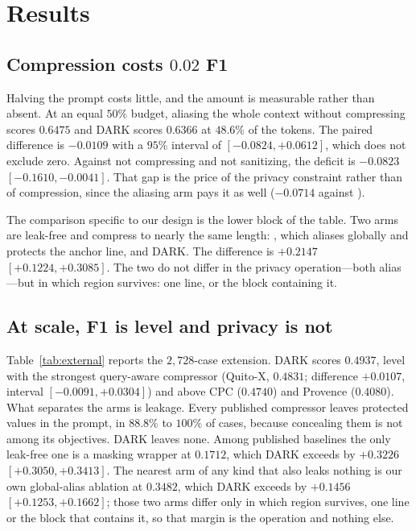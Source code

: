 \section{Results}
\label{sec:results}



\subsection{Compression costs $0.02$ F1}

Halving the prompt costs little, and the amount is measurable rather than absent. At an equal $50\%$
budget, aliasing the whole context without compressing scores $0.6475$ and \textsc{DARK} scores
$0.6366$ at
$48.6\%$ of the tokens. The paired difference is $-0.0109$ with a $95\%$ interval of
$[-0.0824,+0.0612]$, which does not exclude zero. Against not compressing and not sanitizing,
the deficit is $-0.0823$ $[-0.1610,-0.0041]$. That gap is the price of the privacy
constraint rather than of compression, since the aliasing arm pays it as well ($-0.0714$
against ).

The comparison specific to our design is the lower block of the table. Two arms are
leak-free and compress to nearly the same length: , which aliases
globally and protects the anchor line, and \textsc{DARK}. The difference is $+0.2147$
$[+0.1224,+0.3085]$. The two do not differ in the privacy operation---both alias---but in
which region survives: one line, or the block containing it.



\subsection{At scale, F1 is level and privacy is not}

Table~\ref{tab:external} reports the $2{,}728$-case extension. \textsc{DARK} scores
$0.4937$, level with the strongest query-aware compressor (Quito-X, $0.4831$; difference
$+0.0107$, interval $[-0.0091,+0.0304]$) and above CPC ($0.4740$) and Provence ($0.4080$).
What separates the arms is leakage. Every published compressor leaves protected values in
the prompt, in $88.8\%$ to $100\%$ of cases, because concealing them is not among its
objectives. \textsc{DARK} leaves none. Among published baselines the only leak-free one is a
masking wrapper at $0.1712$, which \textsc{DARK} exceeds by $+0.3226$
$[+0.3050,+0.3413]$. The nearest arm of any kind that also leaks nothing is our own
global-alias ablation at $0.3482$, which \textsc{DARK} exceeds by $+0.1456$
$[+0.1253,+0.1662]$; those two arms differ only in which region survives, one line or the
block that contains it, so that margin is the operation and nothing else.

